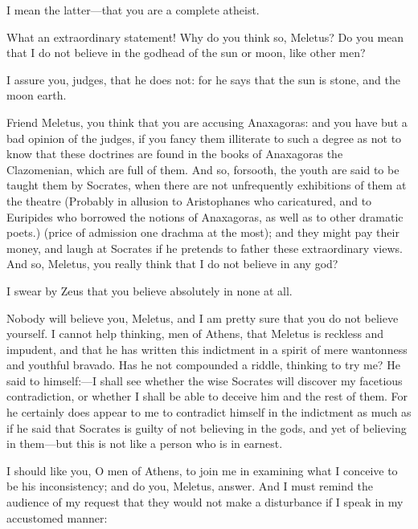 \documentclass[11pt,letter]{article}
\begin{document}
\par  I mean the latter—that you are a complete atheist.

\par  What an extraordinary statement! Why do you think so, Meletus? Do you mean that I do not believe in the godhead of the sun or moon, like other men?

\par  I assure you, judges, that he does not: for he says that the sun is stone, and the moon earth.

\par  Friend Meletus, you think that you are accusing Anaxagoras: and you have but a bad opinion of the judges, if you fancy them illiterate to such a degree as not to know that these doctrines are found in the books of Anaxagoras the Clazomenian, which are full of them. And so, forsooth, the youth are said to be taught them by Socrates, when there are not unfrequently exhibitions of them at the theatre (Probably in allusion to Aristophanes who caricatured, and to Euripides who borrowed the notions of Anaxagoras, as well as to other dramatic poets.) (price of admission one drachma at the most); and they might pay their money, and laugh at Socrates if he pretends to father these extraordinary views. And so, Meletus, you really think that I do not believe in any god?

\par  I swear by Zeus that you believe absolutely in none at all.

\par  Nobody will believe you, Meletus, and I am pretty sure that you do not believe yourself. I cannot help thinking, men of Athens, that Meletus is reckless and impudent, and that he has written this indictment in a spirit of mere wantonness and youthful bravado. Has he not compounded a riddle, thinking to try me? He said to himself:—I shall see whether the wise Socrates will discover my facetious contradiction, or whether I shall be able to deceive him and the rest of them. For he certainly does appear to me to contradict himself in the indictment as much as if he said that Socrates is guilty of not believing in the gods, and yet of believing in them—but this is not like a person who is in earnest.

\par  I should like you, O men of Athens, to join me in examining what I conceive to be his inconsistency; and do you, Meletus, answer. And I must remind the audience of my request that they would not make a disturbance if I speak in my accustomed manner:
\end{document}
